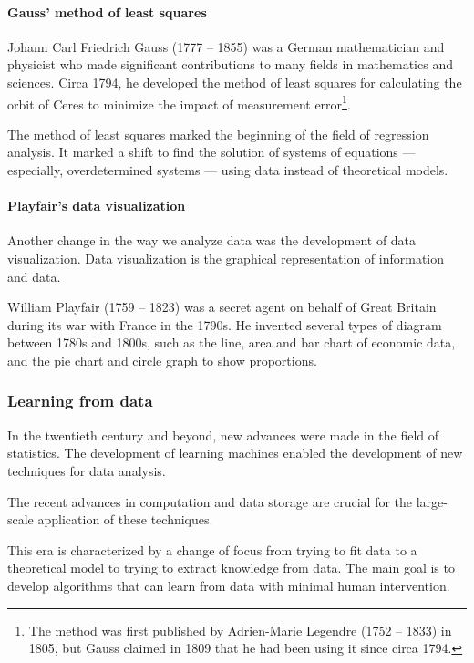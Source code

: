 \paragraph{Gauss' method of least squares}

Johann Carl Friedrich Gauss (1777 -- 1855) was a German mathematician and physicist who made
significant contributions to many fields in mathematics and sciences.  Circa 1794, he
developed the method of least squares for calculating the orbit of Ceres to minimize the
impact of measurement error\footnote{The method was first published by Adrien-Marie
Legendre (1752 -- 1833) in 1805, but Gauss claimed in 1809 that he
had been using it since circa 1794.}.

The method of least squares marked the beginning of the field of regression analysis.  It
marked a shift to find the solution of systems of equations --- especially, overdetermined
systems --- using data instead of theoretical models.

\paragraph{Playfair's data visualization}

Another change in the way we analyze data was the development of data visualization.  Data
visualization is the graphical representation of information and data.

William Playfair (1759 -- 1823) was a secret agent on behalf of Great Britain during its
war with France in the 1790s.  He invented several types of diagram between 1780s and
1800s, such as the line, area and bar chart of economic data, and the pie chart and circle
graph to show proportions.

\subsubsection{Learning from data}

In the twentieth century and beyond, new advances were made in the field of statistics.
The development of learning machines enabled the development of new techniques for data
analysis.

The recent advances in computation and data storage are crucial for the large-scale
application of these techniques.

This era is characterized by a change of focus from trying to fit data to a theoretical
model to trying to extract knowledge from data.  The main goal is to develop algorithms
that can learn from data with minimal human intervention.

